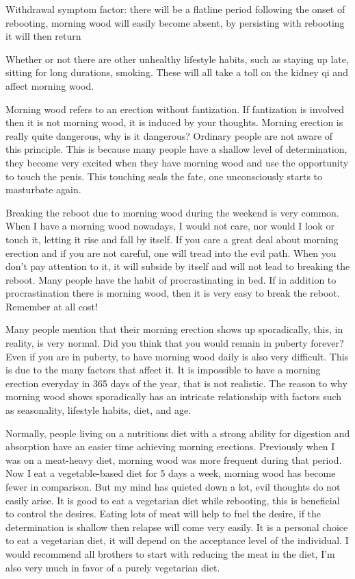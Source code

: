 \documentclass[
]{book}
\begin{document}
Withdrawal symptom factor: there will be a flatline period following the onset of rebooting, morning wood will easily become absent, by persisting with rebooting it will then return

Whether or not there are other unhealthy lifestyle habits, such as staying up late, sitting for long durations, smoking. These will all take a toll on the kidney qi and affect morning wood.

Morning wood refers to an erection without fantization. If fantization is involved then it is not morning wood, it is induced by your thoughts. Morning erection is really quite dangerous, why is it dangerous? Ordinary people are not aware of this principle. This is because many people have a shallow level of determination, they become very excited when they have morning wood and use the opportunity to touch the penis. This touching seals the fate, one unconsciously starts to masturbate again.

Breaking the reboot due to morning wood during the weekend is very common. When I have a morning wood nowadays, I would not care, nor would I look or touch it, letting it rise and fall by itself. If you care a great deal about morning erection and if you are not careful, one will tread into the evil path. When you don't pay attention to it, it will subside by itself and will not lead to breaking the reboot. Many people have the habit of procrastinating in bed. If in addition to procrastination there is morning wood, then it is very easy to break the reboot. Remember at all cost!

Many people mention that their morning erection shows up sporadically, this, in reality, is very normal. Did you think that you would remain in puberty forever? Even if you are in puberty, to have morning wood daily is also very difficult. This is due to the many factors that affect it. It is impossible to have a morning erection everyday in 365 days of the year, that is not realistic. The reason to why morning wood shows sporadically has an intricate relationship with factors such as seasonality, lifestyle habits, diet, and age.

Normally, people living on a nutritious diet with a strong ability for digestion and absorption have an easier time achieving morning erections. Previously when I was on a meat-heavy diet, morning wood was more frequent during that period. Now I eat a vegetable-based diet for 5 days a week, morning wood has become fewer in comparison. But my mind has quieted down a lot, evil thoughts do not easily arise. It is good to eat a vegetarian diet while rebooting, this is beneficial to control the desires. Eating lots of meat will help to fuel the desire, if the determination is shallow then relapse will come very easily. It is a personal choice to eat a vegetarian diet, it will depend on the acceptance level of the individual. I would recommend all brothers to start with reducing the meat in the diet, I'm also very much in favor of a purely vegetarian diet.
\end{document}
